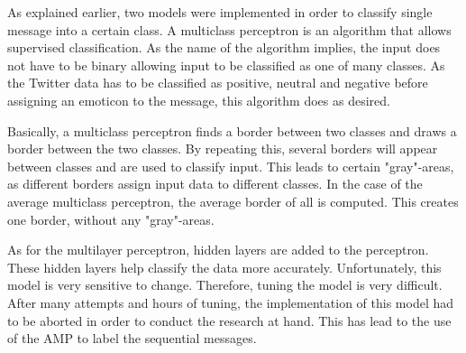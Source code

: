 As explained earlier, two models were implemented in order to classify single message into a certain class.
A multiclass perceptron is an algorithm that allows supervised classification.
As the name of the algorithm implies, the input does not have to be binary allowing input to be classified as one of many classes.
As the Twitter data has to be classified as positive, neutral and negative before assigning an emoticon to the message, this algorithm does as desired. 

Basically, a multiclass perceptron finds a border between two classes and draws a border between the two classes. By repeating this, several borders will appear between classes and are used to classify input. This leads to certain "gray"-areas, as different borders assign input data to different classes. In the case of the average multiclass perceptron, the average border of all is computed. This creates one border, without any "gray"-areas.

As for the multilayer perceptron, hidden layers are added to the perceptron. These hidden layers help classify the data more accurately. Unfortunately, this model is very sensitive to change. Therefore, tuning the model is very difficult. After many attempts and hours of tuning, the implementation of this model had to be aborted in order to conduct the research at hand. This has lead to the use of the AMP to label the sequential messages.
